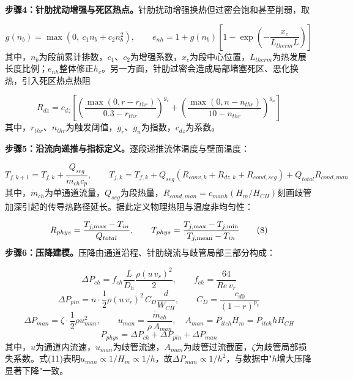 \documentclass[withoutpreface]{cumcmthesis}
\begin{document}
\textbf{步骤4：针肋扰动增强与死区热点。}针肋扰动增强换热但过密会饱和甚至削弱，取

\begin{equation}
g(n_b)=\max\left(0,\ c_1 n_b+c_2 n_b^2\right),\qquad e_{nh}=1+g(n_b)\left[1-\exp\left(-\frac{x_c}{L_{therm}L}\right)\right] \tag{5}
\end{equation}
其中，$n_b$为段前累计排数，$c_1$、$c_2$为增强系数，$x_c$为段中心位置，$L_{therm}$为热发展长度比例；$e_{nh}$整体修正$h_c$。另一方面，针肋过密会造成局部堵塞死区、恶化换热，引入死区热点热阻

\begin{equation}
R_{dz}=c_{dz}\left[\left(\frac{\max(0,r-r_{thr})}{0.3-r_{thr}}\right)^{g_r}+\left(\frac{\max(0,n-n_{thr})}{10-n_{thr}}\right)^{g_n}\right] \tag{6}
\end{equation}
其中，$r_{thr}$、$n_{thr}$为触发阈值，$g_r$、$g_n$为指数，$c_{dz}$为系数。

\textbf{步骤5：沿流向递推与指标定义。}逐段递推流体温度与壁面温度：

\begin{equation}
T_{f,k+1}=T_{f,k}+\frac{Q_{seg}}{\dot m_{ch}c_p},\qquad T_{j,k}=T_{f,k}+Q_{seg}\left(R_{conv,k}+R_{dz,k}+R_{cond,seg}\right)+Q_{total}R_{cond,man} \tag{7}
\end{equation}
其中，$\dot m_{ch}$为单通道流量，$Q_{seg}$为段热量，$R_{cond,man}=c_{manh}(H_m/H_{CH})$刻画歧管加深引起的传导热路径延长。据此定义物理热阻与温度非均匀性：

\begin{equation}
R_{phys}=\frac{T_{j,\max}-T_{in}}{Q_{total}},\qquad T_{phys}=\frac{T_{j,\max}-T_{j,\min}}{T_{j,\rm{mean}}-T_{in}} \tag{8}
\end{equation}
\textbf{步骤6：压降建模。}压降由通道沿程、针肋绕流与歧管局部三部分构成：

\begin{equation}
\Delta P_{ch}=f_{ch}\frac{L}{D_h}\frac{\rho(u\,v_r)^2}{2},\qquad f_{ch}=\frac{64}{Re\,v_r} \tag{9}
\end{equation}
\begin{equation}
\Delta P_{pin}=n\cdot\frac{1}{2}\rho(u\,v_r)^2\,C_D\frac{d}{W_{CH}},\qquad C_D=\frac{c_{d0}}{(1-r)^{p_e}} \tag{10}
\end{equation}
\begin{equation}
\Delta P_{man}=\zeta\cdot\frac{1}{2}\rho u_{man}^2,\qquad u_{man}=\frac{\dot m_{ch}}{\rho\,A_{man}},\quad A_{man}=P_{itch}H_m=P_{itch}hH_{CH} \tag{11}
\end{equation}
\begin{equation}
P_{phys}=\Delta P_{ch}+\Delta P_{pin}+\Delta P_{man} \tag{12}
\end{equation}
其中，$u$为通道内流速，$u_{man}$为歧管流速，$A_{man}$为歧管过流截面，$\zeta$为歧管局部损失系数。式(11)表明$u_{man}\propto 1/H_m\propto 1/h$，故$\Delta P_{man}\propto 1/h^2$，与数据中"$h$增大压降显著下降"一致。
\end{document}
